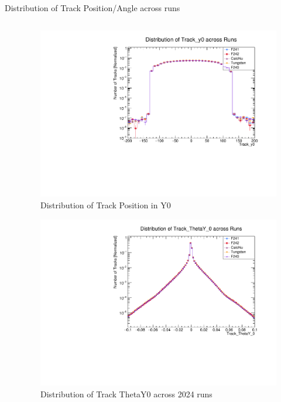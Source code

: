 \begin{frame}{Distribution of Track Position/Angle across runs}
\begin{columns}
\begin{column}{0.5\linewidth}
		\end{column}
		\begin{column}{0.5 \linewidth}
			\vspace{-0.4cm}
			\begin{figure}
				\includegraphics[width=\linewidth]{./RunwisePlots/Track_y0_runwise.pdf}
				\caption{Distribution of Track Position in Y0}
			\end{figure}
			\vspace{-1cm}
			\begin{figure}
				\includegraphics[width=\linewidth]{./RunwisePlots/Track_ThetaY_0_runwise.pdf}
				\caption{Distribution of Track ThetaY0 across 2024 runs}
			\end{figure}
		\end{column}
	\end{columns}
\end{frame}


